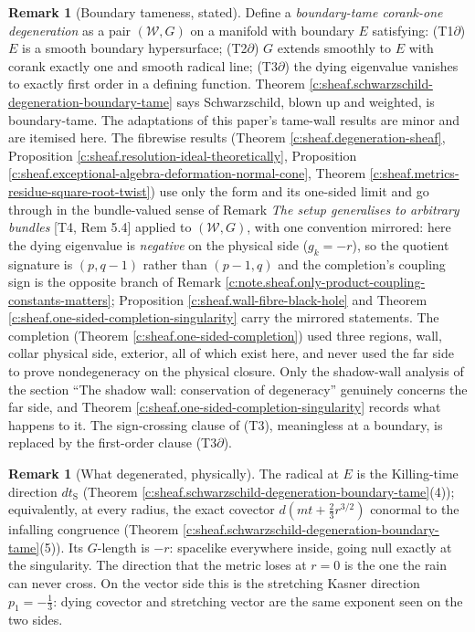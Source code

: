 \documentclass[11pt]{article}
\theoremstyle{definition}
\newtheorem{remark}[theorem]{Remark}
\theoremstyle{plain}
\providecommand{\dtS}{}\renewcommand{\dtS}{dt_{\mathrm{S}}}
\providecommand{\shW}{}\renewcommand{\shW}{\mathcal{W}}
\begin{document}
\begin{remark}[Boundary tameness, stated]\label{c:note.sheaf.boundary-tameness-stated}
Define a \emph{boundary-tame corank-one degeneration} as a pair $(\shW, G)$ on a manifold with boundary $E$ satisfying: (T1$\partial$) $E$ is a smooth boundary hypersurface; (T2$\partial$) $G$ extends smoothly to $E$ with corank exactly one and smooth radical line; (T3$\partial$) the dying eigenvalue vanishes to exactly first order in a defining function. Theorem \ref{c:sheaf.schwarzschild-degeneration-boundary-tame} says Schwarzschild, blown up and weighted, is boundary-tame. The adaptations of this paper's tame-wall results are minor and are itemised here. The fibrewise results (Theorem \ref{c:sheaf.degeneration-sheaf}, Proposition \ref{c:sheaf.resolution-ideal-theoretically}, Proposition \ref{c:sheaf.exceptional-algebra-deformation-normal-cone}, Theorem \ref{c:sheaf.metrics-residue-square-root-twist}) use only the form and its one-sided limit and go through in the bundle-valued sense of Remark \emph{The setup generalises to arbitrary bundles} [T4, Rem 5.4] applied to $(\shW, G)$, with one convention mirrored: here the dying eigenvalue is \emph{negative} on the physical side ($g_k = -r$), so the quotient signature is $(p, q{-}1)$ rather than $(p{-}1, q)$ and the completion's coupling sign is the opposite branch of Remark \ref{c:note.sheaf.only-product-coupling-constants-matters}; Proposition \ref{c:sheaf.wall-fibre-black-hole} and Theorem \ref{c:sheaf.one-sided-completion-singularity} carry the mirrored statements. The completion (Theorem \ref{c:sheaf.one-sided-completion}) used three regions, wall, collar physical side, exterior, all of which exist here, and never used the far side to prove nondegeneracy on the physical closure. Only the shadow-wall analysis of the section ``The shadow wall: conservation of degeneracy'' genuinely concerns the far side, and Theorem \ref{c:sheaf.one-sided-completion-singularity} records what happens to it. The sign-crossing clause of (T3), meaningless at a boundary, is replaced by the first-order clause (T3$\partial$).
\end{remark}

\begin{remark}[What degenerated, physically]\label{c:note.sheaf.what-degenerated-physically}
The radical at $E$ is the Killing-time direction $\dtS$ (Theorem \ref{c:sheaf.schwarzschild-degeneration-boundary-tame}(4)); equivalently, at every radius, the exact covector $d(mt + \tfrac23 r^{3/2})$ conormal to the infalling congruence (Theorem \ref{c:sheaf.schwarzschild-degeneration-boundary-tame}(5)). Its $G$-length is $-r$: spacelike everywhere inside, going null exactly at the singularity. The direction that the metric loses at $r = 0$ is the one the rain can never cross. On the vector side this is the stretching Kasner direction $p_1 = -\tfrac13$: dying covector and stretching vector are the same exponent seen on the two sides.
\end{remark}
\end{document}
